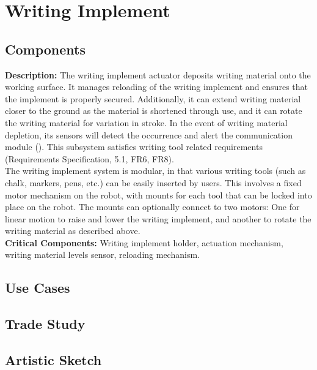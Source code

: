 
\section{Writing Implement}
\label{sec:writing_implement}

\subsection{Components}
\label{sec:subsystem_writing_implement_actuator}
\textbf{Description:} The writing implement actuator deposits writing material onto the working surface. It manages reloading of the writing implement and ensures that the implement is properly secured. Additionally, it can extend writing material closer to the ground as the material is shortened through use, and it can rotate the writing material for variation in stroke. In the event of writing material depletion, its sensors will detect the occurrence and alert the communication module (). This subsystem satisfies writing tool related requirements (Requirements Specification, 5.1, FR6, FR8).\\
The writing implement system is modular, in that various writing tools (such as chalk, markers, pens, etc.) can be easily inserted by users. This involves a fixed motor mechanism on the robot, with mounts for each tool that can be locked into place on the robot. The mounts can optionally connect to two motors: One for linear motion to raise and lower the writing implement, and another to rotate the writing material as described above. \\
\textbf{Critical Components:} Writing implement holder, actuation mechanism, writing material levels sensor, reloading mechanism. \\

\subsection{Use Cases}

\subsection{Trade Study}

\subsection{Artistic Sketch}